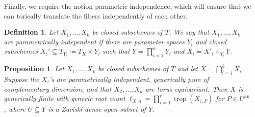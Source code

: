 \documentclass[12pt,reqno,a4paper]{amsart}
\theoremstyle{theoremstyle}
\newtheorem{proposition}[theorem]{Proposition}
\theoremstyle{examplestyle}
\newtheorem{definition}[theorem]{Definition}
\theoremstyle{algorithmstyle}
\newcommand{\an}{{\mathrm{an}}}
\DeclareMathOperator{\trop}{trop}
\begin{document}
Finally, we require the notion parametric independence, which will ensure that we can torically translate the fibers independently of each other.

\begin{definition}\label{def:ParametricallyIndependent}
  Let $X_1,\dots,X_k$ be closed subschemes of $T$. We say that $X_1,\dots,X_k$ are \emph{parametrically independent} if there are parameter spaces $Y_i$ and closed subschemes $X_i'\subseteq T_{Y_i}\coloneqq T_K\times Y_i$ such that $Y = \prod_{i=1}^k Y_i$ and $X_i = X'_{i}\times_{Y_{i}}Y$.
\end{definition}

%
%
%
\begin{proposition}\label{thm:TorusEquivariant}
   Let $X_1,\dots,X_k$ be closed subschemes of $T$ and let $X=\bigcap_{i=1}^k X_i$. Suppose the $X_{i}$'s %
  are parametrically independent, generically pure of complementary dimension, and that $X_2,\dots,X_k$ are torus-equivariant. Then $X$ is generically finite with generic root count $\ell_{X,\eta}=\prod_{i=1}^{r}\trop(X_{i,P})$ for $P\in U^{\an}$, where $U\subseteq Y$ is a Zariski dense open subset of $Y$. %
\end{proposition}
\end{document}
